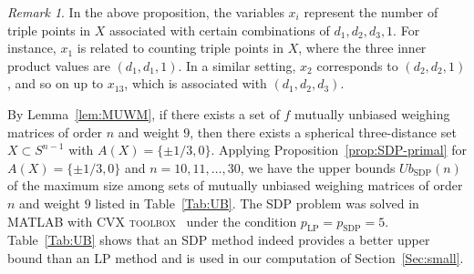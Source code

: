 \documentclass[12pt]{article}
\newtheorem{prop}[thm]{Proposition}
\theoremstyle{remark}
\newtheorem{rem}[thm]{Remark}
\begin{document}
\begin{rem}
In the above proposition, 
the variables $x_i$ represent the number of triple points in $X$ associated 
with certain combinations of $d_1, d_2, d_3,1$. For instance, $x_1$ is related to counting triple points in $X$, where the three inner product values are $(d_1, d_1, 1)$. In a similar setting, $x_2$ corresponds to $(d_2, d_2, 1)$, and so on up to $x_{13}$, which is associated with $(d_1, d_2, d_3)$.
\end{rem}



By Lemma~\ref{lem:MUWM},
if there exists a  set of $f$ mutually unbiased weighing matrices of order $n$ and weight $9$,
then there exists a spherical three-distance set $X \subset S^{n-1}$ with $A(X)=\{\pm 1/3,0\}$.
Applying Proposition~\ref{prop:SDP-primal}
for $A(X)=\{\pm 1/3,0\}$ and $n=10,11,\ldots,30$,
we have the upper bounds $Ub_{\text{SDP}}(n)$ 
of the maximum size  among sets of mutually unbiased weighing matrices of order $n$ and weight $9$
listed in Table~\ref{Tab:UB}.
The SDP problem was solved in MATLAB with \textsc{CVX toolbox}~\cite{DB} under the condition $p_{\text{LP}}= p_{\text{SDP}}=5$. 
Table~\ref{Tab:UB} shows that  an SDP method indeed provides a better upper bound than
an LP method and is used in our computation of Section~\ref{Sec:small}. 
\end{document}
